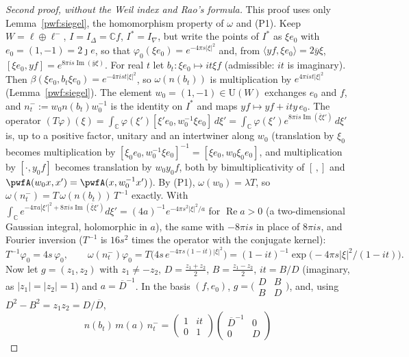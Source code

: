 \documentclass[10pt]{amsart}
\theoremstyle{definition}
\theoremstyle{remark}
\newcommand{\C}{\mathbb C}
\providecommand{\auU}{\mathrm U}
\providecommand{\aubar}[1]{\overline{#1}}
\begin{document}
\begin{proof}[Second proof, without the Weil index and Rao's formula]
This proof uses only Lemma~\ref{pwf:siegel}, the homomorphism property of $\omega$ and (P1). Keep
$W=\ell\oplus\ell^-$, $I=I_\Delta=\C f$, $I^*=I_\nabla$, but write the points of $I^*$ as $\xi e_0$ with
$e_0=(1,-1)=2\jmath e$, so that $\varphi_0(\xi e_0)=e^{-4\pi s|\xi|^2}$ and, from $\langle yf,\xi e_0\rangle=
2\aubar y\xi$, $[\xi e_0,yf]=e^{8\pi is\operatorname{Im}(\aubar y\xi)}$. For real $t$ let $b_t\colon\xi e_0
\mapsto it\xi f$ (admissible: $it$ is imaginary). Then $\beta(\xi e_0,b_t\xi e_0)=e^{-4\pi ist|\xi|^2}$,
so $\omega(n(b_t))$ is multiplication by $e^{4\pi ist|\xi|^2}$ (Lemma~\ref{pwf:siegel}). The element
$w_0=(1,-1)\in\auU(W)$ exchanges $e_0$ and $f$, and $n^-_t:=w_0n(b_t)w_0^{-1}$ is the identity on $I^*$
and maps $yf\mapsto yf+ity\,e_0$. The operator $(T\varphi)(\xi)=\int_\C\varphi(\xi')[\xi'e_0,w_0^{-1}\xi
e_0]\,d\xi'=\int_\C\varphi(\xi')e^{8\pi is\operatorname{Im}(\aubar\xi\xi')}\,d\xi'$ is, up to a positive
factor, unitary and an intertwiner along $w_0$ (translation by $\xi_0$ becomes multiplication by
$[\xi_0e_0,w_0^{-1}\xi e_0]^{-1}=[\xi e_0,w_0\xi_0e_0]$, and multiplication by $[\cdot,y_0f]$ becomes
translation by $w_0y_0f$, both by bimultiplicativity of $[\,,]$ and $\pwfA(w_0x,x')=\pwfA(x,w_0^{-1}x')$).
By (P1), $\omega(w_0)=\lambda T$, so $\omega(n^-_t)=T\,\omega(n(b_t))\,T^{-1}$ exactly. With
$\int_\C e^{-4\pi a|\xi'|^2+8\pi is\operatorname{Im}(\aubar\xi\xi')}d\xi'=(4a)^{-1}e^{-4\pi s^2|\xi|^2/a}$ for
$\operatorname{Re}a>0$ (a two-dimensional Gaussian integral, holomorphic in $a$), the same with
$-8\pi is$ in place of $8\pi is$, and Fourier inversion ($T^{-1}$ is $16s^2$ times the operator with
the conjugate kernel):
\[
T^{-1}\varphi_0=4s\,\varphi_0,\qquad \omega(n^-_t)\varphi_0=T\bigl(4s\,e^{-4\pi s(1-it)|\xi|^2}\bigr)
=(1-it)^{-1}\exp\bigl(-4\pi s|\xi|^2/(1-it)\bigr).
\]
Now let $g=(z_1,z_2)$ with $z_1\ne-z_2$, $D=\frac{z_1+z_2}2$, $B=\frac{z_1-z_2}2$, $it=B/D$ (imaginary,
as $|z_1|=|z_2|=1$) and $a=\aubar D^{-1}$. In the basis $(f,e_0)$, $g=\bigl(\begin{smallmatrix}D&B\\B&D
\end{smallmatrix}\bigr)$, and, using $D^2-B^2=z_1z_2=D/\aubar D$,
\[
n(b_t)\,m(a)\,n^-_t=\begin{pmatrix}1&it\\0&1\end{pmatrix}\begin{pmatrix}\aubar D^{-1}&0\\0&D\end{pmatrix}
\]
\end{proof}
\end{document}
